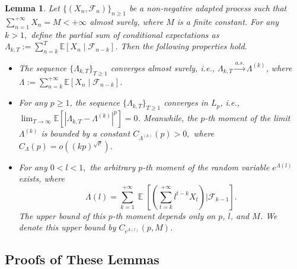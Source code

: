 \documentclass{article} %
\newtheorem{lemma}{Lemma}[section]
\DeclareMathOperator{\Expect}{\mathbb{E}}
\begin{document}
\begin{lemma}\label{lem_important_-1.0}
Let \(\{(X_n, \mathscr{F}_n)\}_{n \geq 1}\) be a non-negative adapted process such that \(\sum_{n=1}^{+\infty} X_n = M < +\infty\) almost surely, where \(M\) is a finite constant. For any $k>1,$ define the partial sum of conditional expectations as \(\Lambda_{k,T} := \sum_{n=k}^{T} \mathbb{E}[X_n \mid \mathscr{F}_{n-k}]\). Then the following properties hold.
\begin{itemize}
    \item[(i)] The sequence \(\{\Lambda_{k,T}\}_{T \geq 1}\) converges almost surely, i.e., \(\Lambda_{k,T} \xrightarrow{a.s.} \Lambda^{(k)}\), where \(\Lambda := \sum_{n=k}^{+\infty} \mathbb{E}[X_n \mid \mathscr{F}_{n-k}]\).
    
    \item[(ii)] For any \(p \geq 1\), the sequence \(\{\Lambda_{k,T}\}_{T \geq 1}\) converges in \(L_p\), i.e., \(\lim_{T \to \infty} \mathbb{E}\left[|\Lambda_{k,T} - \Lambda^{(k)}|^p\right] = 0\). Meanwhile, the \(p\)-th moment of the limit \(\Lambda^{(k)}\) is bounded by a constant \(C_{\Lambda^{(k)}}(p) > 0,\) where \(C_{\Lambda}(p) = o((kp)^{\sqrt{p}}).\)
    \item[(iii)] For any $0<l<1,$ the arbitrary \( p \)-th moment of the random variable \( e^{\Lambda(l)} \) exists, where
   \[
   \Lambda(l) = \sum_{k=1}^{+\infty} \Expect\left[\left(\sum_{t=k}^{+\infty} l^{t-k} X_{t}\right) \bigg|\mathscr{F}_{k-1}\right].
\]
The upper bound of this \( p \)-th moment depends only on \( p \), \( l \), and \( M \). We denote this upper bound by \( C_{e^{\Lambda(l)}}(p, M) \).

    \end{itemize}
    \end{lemma}
\subsection{Proofs of These Lemmas}
\end{document}
